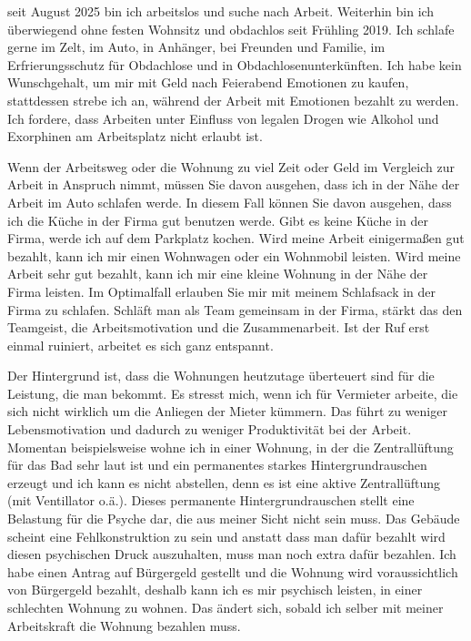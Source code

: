 		seit August 2025 bin ich arbeitslos und suche nach Arbeit.
		Weiterhin bin ich überwiegend ohne festen Wohnsitz und obdachlos seit Frühling 2019.
		Ich schlafe gerne im Zelt, im Auto, in Anhänger, bei Freunden und Familie, im Erfrierungsschutz für Obdachlose und in Obdachlosenunterkünften.
		Ich habe kein Wunschgehalt, um mir mit Geld nach Feierabend Emotionen zu kaufen, stattdessen strebe ich an, während der Arbeit mit Emotionen bezahlt zu werden.
		Ich fordere, dass Arbeiten unter Einfluss von legalen Drogen wie Alkohol und Exorphinen am Arbeitsplatz nicht erlaubt ist.

		Wenn der Arbeitsweg oder die Wohnung zu viel Zeit oder Geld im Vergleich zur Arbeit in Anspruch nimmt, müssen Sie davon ausgehen, dass ich in der Nähe der Arbeit im Auto schlafen werde.
		In diesem Fall können Sie davon ausgehen, dass ich die Küche in der Firma gut benutzen werde.
		Gibt es keine Küche in der Firma, werde ich auf dem Parkplatz kochen.
		Wird meine Arbeit einigermaßen gut bezahlt, kann ich mir einen Wohnwagen oder ein Wohnmobil leisten.
		Wird meine Arbeit sehr gut bezahlt, kann ich mir eine kleine Wohnung in der Nähe der Firma leisten.
		Im Optimalfall erlauben Sie mir mit meinem Schlafsack in der Firma zu schlafen.
		Schläft man als Team gemeinsam in der Firma, stärkt das den Teamgeist, die Arbeitsmotivation und die Zusammenarbeit.
		Ist der Ruf erst einmal ruiniert, arbeitet es sich ganz entspannt.

		Der Hintergrund ist, dass die Wohnungen heutzutage überteuert sind für die Leistung, die man bekommt.
		Es stresst mich, wenn ich für Vermieter arbeite, die sich nicht wirklich um die Anliegen der Mieter kümmern.
		Das führt zu weniger Lebensmotivation und dadurch zu weniger Produktivität bei der Arbeit.
		Momentan beispielsweise wohne ich in einer Wohnung, in der die Zentrallüftung für das Bad sehr laut ist und ein permanentes starkes Hintergrundrauschen erzeugt und ich kann es nicht abstellen, denn es ist eine aktive Zentrallüftung (mit Ventillator o.ä.).
		Dieses permanente Hintergrundrauschen stellt eine Belastung für die Psyche dar, die aus meiner Sicht nicht sein muss.
		Das Gebäude scheint eine Fehlkonstruktion zu sein und anstatt dass man dafür bezahlt wird diesen psychischen Druck auszuhalten, muss man noch extra dafür bezahlen.
		Ich habe einen Antrag auf Bürgergeld gestellt und die Wohnung wird voraussichtlich von Bürgergeld bezahlt, deshalb kann ich es mir psychisch leisten, in einer schlechten Wohnung zu wohnen.
		Das ändert sich, sobald ich selber mit meiner Arbeitskraft die Wohnung bezahlen muss.

